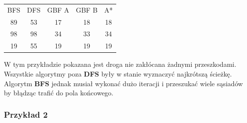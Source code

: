 \documentclass{article}
\begin{document}
\begin{center}
\begin{tabular}{c c c c c}
BFS & DFS & GBF A & GBF B & A* \\
89 & 53 & 17 & 18 & 18 \\
98 & 98 & 34 & 33 & 34 \\ 
19 & 55 & 19 & 19 & 19 \\
\end{tabular}
\end{center}
W tym przykładzie pokazana jest droga nie zakłócana żadnymi przeszkodami. Wszystkie algorytmy poza \textbf{DFS} były w stanie wyznaczyć najkrótszą ścieżkę. Algorytm \textbf{BFS} jednak musiał wykonać dużo iteracji i przeszukać wiele sąsiadów by błądząc trafić do pola końcowego. 

\subsubsection{Przykład 2}
\end{document}
